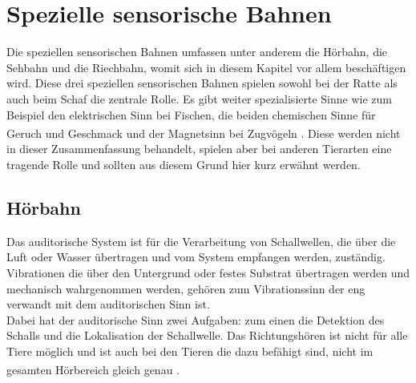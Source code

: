 \documentclass[12pt,a4paper,pdftex]{article}
\begin{document}
\newpage
\section{Spezielle sensorische Bahnen}
\label{sec:spezsens}
Die speziellen sensorischen Bahnen umfassen unter anderem die Hörbahn, die Sehbahn und die Riechbahn, womit sich in diesem Kapitel vor allem beschäftigen wird. Diese drei speziellen sensorischen Bahnen spielen sowohl bei der Ratte als auch beim Schaf die zentrale Rolle. Es gibt weiter spezialisierte Sinne wie zum Beispiel den elektrischen Sinn bei Fischen, die beiden chemischen Sinne für Geruch und Geschmack und der Magnetsinn bei Zugvögeln \textsuperscript{\cite{smith2008biology}}. Diese werden nicht in dieser Zusammenfassung behandelt, spielen aber bei anderen Tierarten eine tragende Rolle und sollten aus diesem Grund hier kurz erwähnt werden.

\subsection{Hörbahn}

Das auditorische System ist für die Verarbeitung von Schallwellen, die über die Luft oder Wasser übertragen und vom System empfangen werden, zuständig. Vibrationen die über den Untergrund oder festes Substrat übertragen werden und mechanisch wahrgenommen werden, gehören zum Vibrationssinn der eng verwandt mit dem auditorischen Sinn ist.
\\
\noindent Dabei hat der auditorische Sinn zwei Aufgaben: zum einen die Detektion des Schalls und die Lokalisation der Schallwelle. Das Richtungshören ist nicht für alle Tiere möglich und ist auch bei den Tieren die dazu befähigt sind, nicht im gesamten Hörbereich gleich genau \textsuperscript{\cite[18]{penzlin2005tierphys}}.
\end{document}
